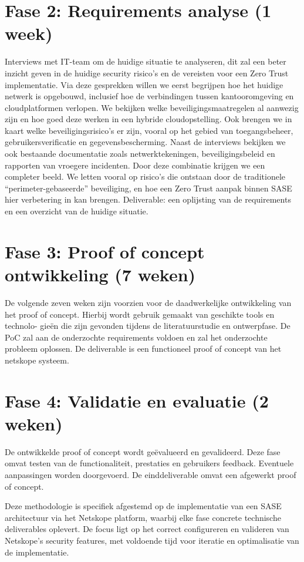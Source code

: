 \section{Fase 2: Requirements analyse (1 week)}
Interviews met IT-team om de huidige situatie te analyseren, dit zal een beter inzicht geven in de huidige security risico's en de vereisten voor een Zero Trust implementatie. 
Via deze gesprekken willen we eerst begrijpen hoe het huidige netwerk is opgebouwd, inclusief hoe de verbindingen tussen kantooromgeving en cloudplatformen verlopen. We bekijken welke beveiligingsmaatregelen al aanwezig zijn en hoe goed deze werken in een hybride cloudopstelling. Ook brengen we in kaart welke beveiligingsrisico’s er zijn, vooral op het gebied van toegangsbeheer, gebruikersverificatie en gegevensbescherming.
Naast de interviews bekijken we ook bestaande documentatie zoals netwerktekeningen, beveiligingsbeleid en rapporten van vroegere incidenten. Door deze combinatie krijgen we een completer beeld. We letten vooral op risico’s die ontstaan door de traditionele “perimeter-gebaseerde” beveiliging, en hoe een Zero Trust aanpak binnen SASE hier verbetering in kan brengen. Deliverable: een oplijsting van de requirements en een overzicht van de huidige situatie.

\section{Fase 3: Proof of concept ontwikkeling (7 weken)}
De volgende zeven weken zijn voorzien voor de daadwerkelijke ontwikkeling van het
proof of concept. Hierbij wordt gebruik gemaakt van geschikte tools en technolo-
gieën die zijn gevonden tijdens de literatuurstudie en ontwerpfase. De PoC zal aan de onderzochte requirements voldoen en zal het onderzochte probleem oplossen. De deliverable is een functioneel proof of concept van het netskope systeem.

\section{Fase 4: Validatie en evaluatie (2 weken)}
De ontwikkelde proof of concept wordt geëvalueerd en gevalideerd. Deze fase omvat testen van de functionaliteit, prestaties en
gebruikers feedback. Eventuele aanpassingen worden doorgevoerd. De einddeliverable omvat een afgewerkt proof of concept.

Deze methodologie is specifiek afgestemd op de implementatie van een SASE architectuur via het Netskope platform, waarbij elke fase concrete technische deliverables oplevert. De focus ligt op het correct configureren en valideren van Netskope's security features, met voldoende tijd voor iteratie en optimalisatie van de implementatie.

